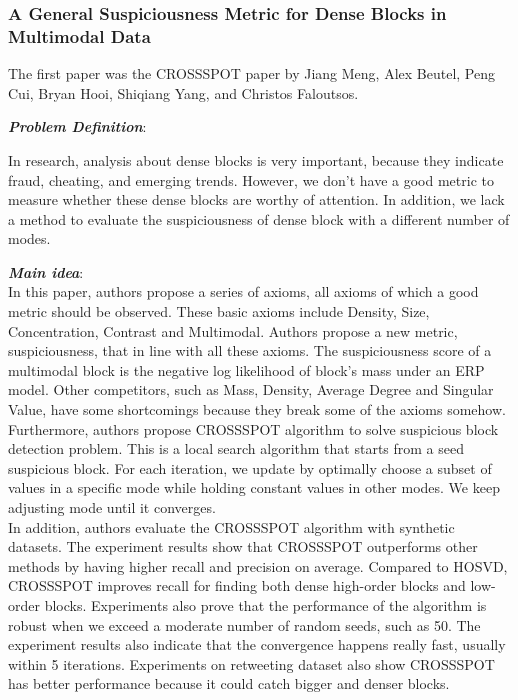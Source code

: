 \subsubsection{A General Suspiciousness Metric for Dense Blocks in Multimodal Data}
The first paper was the CROSSSPOT paper by Jiang Meng, Alex Beutel, Peng Cui, Bryan Hooi, Shiqiang Yang, and Christos Faloutsos. \cite{jiang2015general}
\begin{itemize*}
\item {\em \textbf{Problem Definition}}: 

In research, analysis about dense blocks is very important, because they indicate fraud, cheating, and emerging trends. However, we don’t have a good metric to measure whether these dense blocks are worthy of attention. In addition, we lack a method to evaluate the suspiciousness of dense block with a different number of modes.  \\ 


\item {\em \textbf{Main idea}}: \\
In this paper, authors propose a series of axioms, all axioms of which a good metric should be observed. These basic axioms include Density, Size, Concentration, Contrast and Multimodal. Authors propose a new metric, suspiciousness, that in line with all these axioms. The suspiciousness score of a multimodal block is the negative log likelihood of block’s mass under an ERP model. Other competitors, such as Mass, Density, Average Degree and Singular Value, have some shortcomings because they break some of the axioms somehow.  \\ 


Furthermore, authors propose CROSSSPOT algorithm to solve suspicious block detection problem. This is a local search algorithm that starts from a seed suspicious block. For each iteration, we update by optimally choose a subset of values in a specific mode while holding constant values in other modes. We keep adjusting mode until it converges.  \\ 


In addition, authors evaluate the CROSSSPOT algorithm with synthetic datasets. The experiment results show that CROSSSPOT outperforms other methods by having higher recall and precision on average. Compared to HOSVD, CROSSSPOT improves recall for finding both dense high-order blocks and low-order blocks. Experiments also prove that the performance of the algorithm is robust when we exceed a moderate number of random seeds, such as 50. The experiment results also indicate that the convergence happens really fast, usually within 5 iterations. Experiments on retweeting dataset also show CROSSSPOT has better performance because it could catch bigger and denser blocks. \\ 



\end{itemize*}
